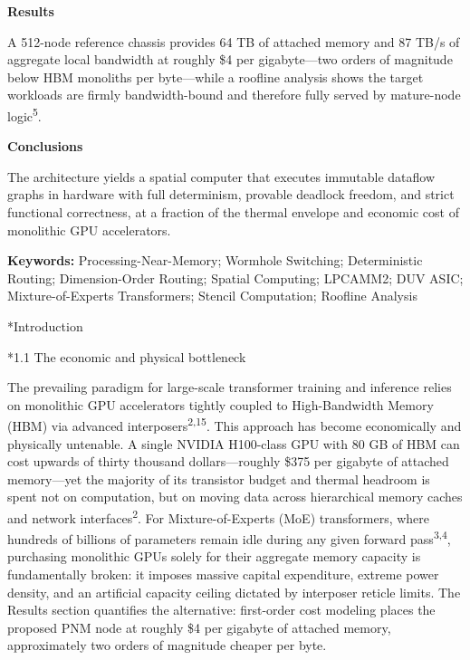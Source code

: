 \documentclass[12pt]{article}
\makeatletter
\renewcommand\section{\@startsection{section}{1}{\z@}{-1.2ex \@plus -0.2ex}{0.4ex}{\normalsize\bfseries}}
\renewcommand\subsection{\@startsection{subsection}{2}{\z@}{-1.0ex \@plus -0.2ex}{0.3ex}{\normalsize\bfseries}}
\makeatother
\begin{document}
\textbf{Results}

A 512-node reference chassis provides 64 TB of attached memory and 87 TB/s of aggregate local bandwidth at roughly \$4 per gigabyte---two orders of magnitude below HBM monoliths per byte---while a roofline analysis shows the target workloads are firmly bandwidth-bound and therefore fully served by mature-node logic\textsuperscript{5}.

\textbf{Conclusions}

The architecture yields a spatial computer that executes immutable dataflow graphs in hardware with full determinism, provable deadlock freedom, and strict functional correctness, at a fraction of the thermal envelope and economic cost of monolithic GPU accelerators.

\noindent\textbf{Keywords:} Processing-Near-Memory; Wormhole Switching; Deterministic Routing; Dimension-Order Routing; Spatial Computing; LPCAMM2; DUV ASIC; Mixture-of-Experts Transformers; Stencil Computation; Roofline Analysis

\section*{Introduction}

\subsection*{1.1 The economic and physical bottleneck}

The prevailing paradigm for large-scale transformer training and inference relies on monolithic GPU accelerators tightly coupled to High-Bandwidth Memory (HBM) via advanced interposers\textsuperscript{2,15}. This approach has become economically and physically untenable. A single NVIDIA H100-class GPU with 80 GB of HBM can cost upwards of thirty thousand dollars---roughly \$375 per gigabyte of attached memory---yet the majority of its transistor budget and thermal headroom is spent not on computation, but on moving data across hierarchical memory caches and network interfaces\textsuperscript{2}. For Mixture-of-Experts (MoE) transformers, where hundreds of billions of parameters remain idle during any given forward pass\textsuperscript{3,4}, purchasing monolithic GPUs solely for their aggregate memory capacity is fundamentally broken: it imposes massive capital expenditure, extreme power density, and an artificial capacity ceiling dictated by interposer reticle limits. The Results section quantifies the alternative: first-order cost modeling places the proposed PNM node at roughly \$4 per gigabyte of attached memory, approximately two orders of magnitude cheaper per byte.
\end{document}

